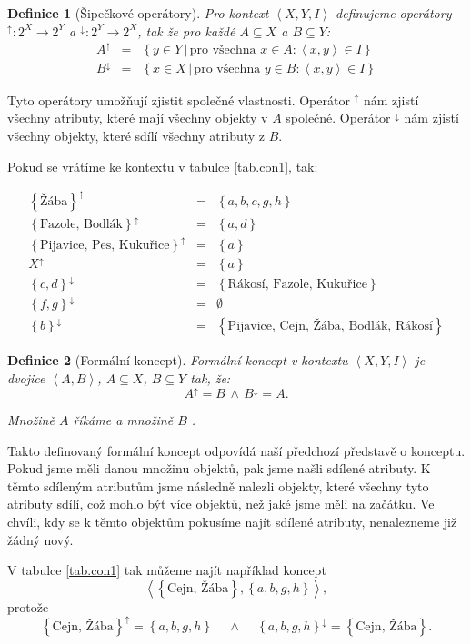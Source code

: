 \documentclass[12pt]{article}
\newcommand{\sep}{\,|\,}
\newcommand{\foreach}{\mbox{pro všechna }}
\newcommand{\adds}[1]{\left\{#1\right\}}
\newcommand{\addsp}[1]{\left<#1\right>}
\newcommand{\logand}{\,\wedge\,}
\newcommand{\context}{\addsp{X, Y, I}}
\newcommand{\AB}{\addsp{A, B}}
\newcommand{\up}{^{\uparrow}}
\newcommand{\down}{^{\downarrow}}
\newtheorem{mydef}{Definice}
\begin{document}
\begin{mydef}[Šipečkové operátory]
Pro kontext $\context$ definujeme operátory $\up:2^X\rightarrow2^Y$ a $\down:2^Y\rightarrow2^X$, tak že pro každé $A\subseteq X$ a $B\subseteq Y$:
\begin{eqnarray}
A\up&=&\adds{y\in Y\sep \foreach x \in A: \addsp{x, y}\in I}\\
B\down&=&\adds{x\in X\sep\foreach y\in B:\addsp{x, y} \in I}
\end{eqnarray}
\end{mydef}

Tyto operátory umožňují zjistit společné vlastnosti. Operátor $\up$ nám zjistí všechny atributy, které mají všechny objekty v $A$ společné. Operátor $\down$ nám zjistí všechny objekty, které sdílí všechny atributy z $B$. 

Pokud se vrátíme ke kontextu v tabulce \ref{tab.con1}, tak:

\begin{eqnarray*}
\adds{\mbox{Žába}}\up&=&\adds{a, b, c, g, h}\\
\adds{\mbox{Fazole, Bodlák}}\up&=&\adds{a, d}\\
\adds{\mbox{Pijavice, Pes, Kukuřice}}\up&=&\adds{a}\\
X\up&=&\adds{a}\\
\adds{c, d}\down&=&\adds{\mbox{Rákosí, Fazole, Kukuřice}}\\
\adds{f, g}\down&=&\emptyset\\
\adds{b}\down&=&\adds{\mbox{Pijavice, Cejn, Žába, Bodlák, Rákosí}}
\end{eqnarray*}


\begin{mydef}[Formální koncept]
Formální koncept v kontextu $\context$ je dvojice $\AB$, $A\subseteq X$, $B\subseteq Y$ tak, že:
$$A\up=B\logand B\down =A.$$

Množině $A$ říkáme  a množině $B$ .
\end{mydef}

Takto definovaný formální koncept odpovídá naší předchozí představě o konceptu. Pokud jsme měli danou množinu objektů, pak jsme našli sdílené atributy. K těmto sdíleným atributům jsme následně nalezli objekty, které všechny tyto atributy sdílí, což mohlo být více objektů, než jaké jsme měli na začátku. Ve chvíli, kdy se k těmto objektům pokusíme najít sdílené atributy, nenalezneme již žádný nový.

V tabulce \ref{tab.con1} tak můžeme najít například koncept 
$$\addsp{\adds{\mbox{Cejn, Žába}}, \adds{a, b, g, h}},$$ 
protože 
$$\adds{\mbox{Cejn, Žába}}\up=\adds{a, b, g, h}\quad \logand \quad \adds{a, b, g, h}\down=\adds{\mbox{Cejn, Žába}}.$$
\end{document}
